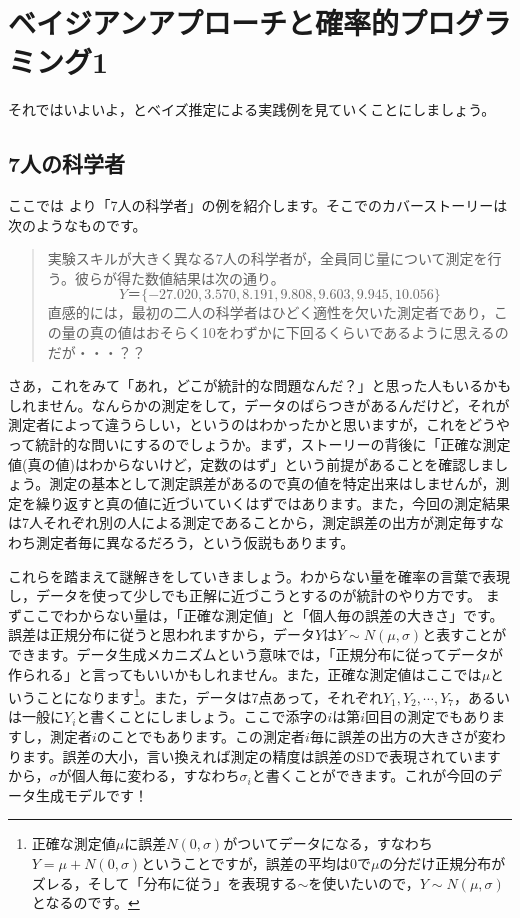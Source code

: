 \documentclass{ltjsbook}
\begin{document}
\chapter{ベイジアンアプローチと確率的プログラミング1}
それではいよいよ，とベイズ推定による実践例を見ていくことにしましょう。
\label{x18_MCMC}
\section{7人の科学者}
ここでは \textcite{Lee201709}より「7人の科学者」の例を紹介します。そこでのカバーストーリーは次のようなものです。

\begin{quote}
	実験スキルが大きく異なる7人の科学者が，全員同じ量について測定を行う。彼らが得た数値結果は次の通り。
	$$Y＝\lbrace -27.020,3.570,8.191,9.808,9.603,9.945,10.056 \rbrace$$
	直感的には，最初の二人の科学者はひどく適性を欠いた測定者であり，この量の真の値はおそらく10をわずかに下回るくらいであるように思えるのだが・・・？？
\end{quote}

さあ，これをみて「あれ，どこが統計的な問題なんだ？」と思った人もいるかもしれません。なんらかの測定をして，データのばらつきがあるんだけど，それが測定者によって違うらしい，というのはわかったかと思いますが，これをどうやって統計的な問いにするのでしょうか。まず，ストーリーの背後に「正確な測定値(真の値)はわからないけど，定数のはず」という前提があることを確認しましょう。測定の基本として測定誤差があるので真の値を特定出来はしませんが，測定を繰り返すと真の値に近づいていくはずではあります。また，今回の測定結果は7人それぞれ別の人による測定であることから，測定誤差の出方が測定毎すなわち測定者毎に異なるだろう，という仮説もあります。

これらを踏まえて謎解きをしていきましょう。わからない量を確率の言葉で表現し，データを使って少しでも正解に近づこうとするのが統計のやり方です。
まずここでわからない量は，「正確な測定値」と「個人毎の誤差の大きさ」です。誤差は正規分布に従うと思われますから，データ$Y$は$Y\sim N(\mu, \sigma)$と表すことができます。データ生成メカニズムという意味では，「正規分布に従ってデータが作られる」と言ってもいいかもしれません。また，正確な測定値はここでは$\mu$ということになります\footnote{正確な測定値$\mu$に誤差$N(0,\sigma)$がついてデータになる，すなわち$Y=\mu+N(0,\sigma)$ということですが，誤差の平均は$0$で$\mu$の分だけ正規分布がズレる，そして「分布に従う」を表現する$\sim$を使いたいので，$Y\sim N(\mu,\sigma)$となるのです。}。また，データは7点あって，それぞれ$Y_1,Y_2,\cdots,Y_7$，あるいは一般に$Y_i$と書くことにしましょう。ここで添字の$i$は第$i$回目の測定でもありますし，測定者$i$のことでもあります。この測定者$i$毎に誤差の出方の大きさが変わります。誤差の大小，言い換えれば測定の精度は誤差のSDで表現されていますから，$\sigma$が個人毎に変わる，すなわち$\sigma_i$と書くことができます。これが今回のデータ生成モデルです！
\end{document}
